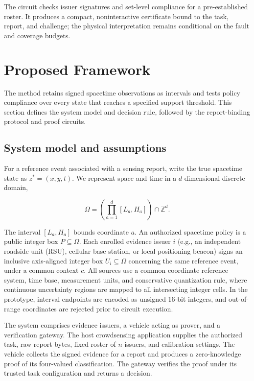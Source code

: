 \documentclass[pdflatex,iicol,sn-mathphys-num]{sn-jnl}
\theoremstyle{thmstyleone}
\begin{document}
The circuit checks issuer signatures and set-level compliance for a pre-established roster. It produces a compact, noninteractive certificate bound to the task, report, and challenge; the physical interpretation remains conditional on the fault and coverage budgets.

\section{Proposed Framework}
The method retains signed spacetime observations as intervals and tests policy compliance over every state that reaches a specified support threshold. This section defines the system model and decision rule, followed by the report-binding protocol and proof circuits.

\subsection{System model and assumptions}
For a reference event associated with a sensing report, write the true spacetime state as $z^* = (x, y, t)$. We represent space and time in a $d$-dimensional discrete domain,


\begin{equation}\label{eq:domain}
\Omega = \left(\prod_{a=1}^{d} [L_a, H_a]\right) \cap \mathbb{Z}^d.
\end{equation}


The interval $[L_a, H_a]$ bounds coordinate $a$. An authorized spacetime policy is a public integer box $P \subseteq \Omega$. Each enrolled evidence issuer $i$ (e.g., an independent roadside unit (RSU), cellular base station, or local positioning beacon) signs an inclusive axis-aligned integer box $U_i \subseteq \Omega$ concerning the same reference event, under a common context $c$. All sources use a common coordinate reference system, time base, measurement units, and conservative quantization rule, where continuous uncertainty regions are mapped to all intersecting integer cells. In the prototype, interval endpoints are encoded as unsigned 16-bit integers, and out-of-range coordinates are rejected prior to circuit execution.

The system comprises evidence issuers, a vehicle acting as prover, and a verification gateway. The host crowdsensing application supplies the authorized task, raw report bytes, fixed roster of $n$ issuers, and calibration settings. The vehicle collects the signed evidence for a report and produces a zero-knowledge proof of its four-valued classification. The gateway verifies the proof under its trusted task configuration and returns a decision.
\end{document}
